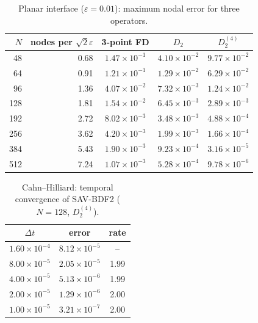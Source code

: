 \documentclass[11pt]{article}
\begin{document}
\begin{table}[htbp]\centering\small
\caption{Planar interface ($\varepsilon=0.01$): maximum nodal error for three operators.}
\begin{tabular}{rr ccc}
\toprule
$N$ & nodes per $\sqrt2\varepsilon$ & 3-point FD & $D_2$ & $D_2^{(4)}$\\
\midrule
48 & 0.68 & $1.47{\times}10^{-1}$ & $4.10{\times}10^{-2}$ & $9.77{\times}10^{-2}$\\
64 & 0.91 & $1.21{\times}10^{-1}$ & $1.29{\times}10^{-2}$ & $6.29{\times}10^{-2}$\\
96 & 1.36 & $4.07{\times}10^{-2}$ & $7.32{\times}10^{-3}$ & $1.24{\times}10^{-2}$\\
128 & 1.81 & $1.54{\times}10^{-2}$ & $6.45{\times}10^{-3}$ & $2.89{\times}10^{-3}$\\
192 & 2.72 & $8.02{\times}10^{-3}$ & $3.48{\times}10^{-3}$ & $4.88{\times}10^{-4}$\\
256 & 3.62 & $4.20{\times}10^{-3}$ & $1.99{\times}10^{-3}$ & $1.66{\times}10^{-4}$\\
384 & 5.43 & $1.90{\times}10^{-3}$ & $9.23{\times}10^{-4}$ & $3.16{\times}10^{-5}$\\
512 & 7.24 & $1.07{\times}10^{-3}$ & $5.28{\times}10^{-4}$ & $9.78{\times}10^{-6}$\\
\bottomrule
\end{tabular}
\end{table}

\begin{table}[htbp]\centering\small
\caption{Cahn--Hilliard: temporal convergence of SAV-BDF2 ($N=128$, $D_2^{(4)}$).}
\begin{tabular}{c cc}
\toprule
$\Delta t$ & error & rate\\
\midrule
$1.60{\times}10^{-4}$ & $8.12{\times}10^{-5}$ & --\\
$8.00{\times}10^{-5}$ & $2.05{\times}10^{-5}$ & 1.99\\
$4.00{\times}10^{-5}$ & $5.13{\times}10^{-6}$ & 1.99\\
$2.00{\times}10^{-5}$ & $1.29{\times}10^{-6}$ & 2.00\\
$1.00{\times}10^{-5}$ & $3.21{\times}10^{-7}$ & 2.00\\
\bottomrule
\end{tabular}
\end{table}
\end{document}

